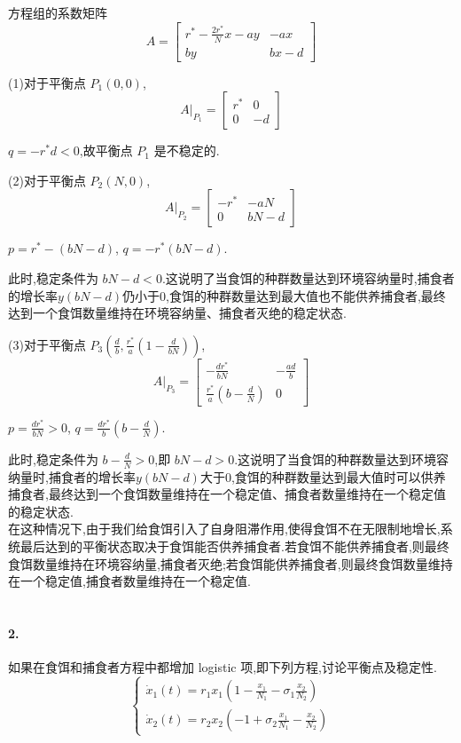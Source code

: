 \documentclass{article}
\begin{document}
    方程组的系数矩阵
    \[
    A = \begin{bmatrix}
        r^* - \frac{2r^*}{N} x - ay & -ax \\
        by & bx - d
    \end{bmatrix}
    \]

    (1)对于平衡点 $P_1(0,0)$, 
    \[
    A|_{P_1} = \begin{bmatrix}
        r^* & 0 \\
        0 & -d
    \end{bmatrix}
    \]

    $q=-r^*d < 0$,故平衡点 $P_1$ 是不稳定的.

    (2)对于平衡点 $P_2(N,0)$,
    \[
    A|_{P_2} = \begin{bmatrix}
        -r^* & -aN \\
        0 & bN - d
    \end{bmatrix}
    \]

    $p=r^*-(bN-d)$, $q=-r^*(bN-d)$.
    
    此时,稳定条件为 $bN-d < 0$.这说明了当食饵的种群数量达到环境容纳量时,捕食者的增长率$y (bN-d)$仍小于$0$,食饵的种群数量达到最大值也不能供养捕食者,最终达到一个食饵数量维持在环境容纳量、捕食者灭绝的稳定状态.

    (3)对于平衡点 $P_3(\frac{d}{b}, \frac{r^*}{a}(1- \frac{d}{bN}))$,
    \[
    A|_{P_3} = \begin{bmatrix}
        -\frac{dr^*}{bN} & -\frac{ad}{b} \\
        \frac{r^*}{a}\left(b-\frac{d}{N}\right) & 0
    \end{bmatrix}
    \]

    $p=\frac{dr^*}{bN} > 0$, $q=\frac{dr^*}{b}\left(b-\frac{d}{N}\right)$.

    此时,稳定条件为 $b-\frac{d}{N}>0$,即 $bN-d>0$.这说明了当食饵的种群数量达到环境容纳量时,捕食者的增长率$y (bN-d)$大于$0$,食饵的种群数量达到最大值时可以供养捕食者,最终达到一个食饵数量维持在一个稳定值、捕食者数量维持在一个稳定值的稳定状态.\\

    在这种情况下,由于我们给食饵引入了自身阻滞作用,使得食饵不在无限制地增长,系统最后达到的平衡状态取决于食饵能否供养捕食者.若食饵不能供养捕食者,则最终食饵数量维持在环境容纳量,捕食者灭绝;若食饵能供养捕食者,则最终食饵数量维持在一个稳定值,捕食者数量维持在一个稳定值.\\
~\\

\paragraph{2.}如果在食饵和捕食者方程中都增加 logistic 项,即下列方程,讨论平衡点及稳定性.
    \[
    \begin{cases}
        \dot{x}_1(t) = r_1 x_1 \left( 1 - \frac{x_1}{N_1} - \sigma_1 \frac{x_2}{N_2} \right) \\
        \dot{x}_2(t) = r_2 x_2 \left( -1 + \sigma_2 \frac{x_1}{N_1} - \frac{x_2}{N_2} \right)
    \end{cases}
    \]
\end{document}
